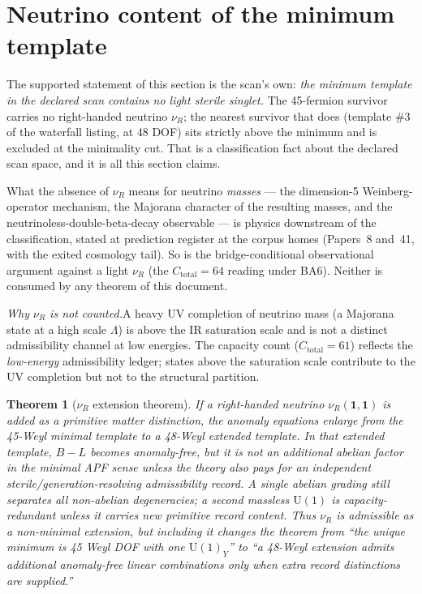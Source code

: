 \documentclass[11pt]{article}
\newtheorem{theorem}{Theorem}[section]
\theoremstyle{definition}
\newcommand{\U}{\mathrm{U}}
\begin{document}
\section{Neutrino content of the minimum template}
\label{sec:neutrinos}

The supported statement of this section is the scan's own: \emph{the
minimum template in the declared scan contains no light sterile
singlet.}  The 45-fermion survivor carries no right-handed neutrino
$\nu_R$; the nearest survivor that does (template \#3 of the
waterfall listing, at 48 DOF) sits strictly above the minimum and is
excluded at the minimality cut.  That is a classification fact about
the declared scan space, and it is all this section claims.

What the absence of $\nu_R$ means for neutrino \emph{masses} ---
the dimension-5 Weinberg-operator mechanism, the Majorana character
of the resulting masses, and the neutrinoless-double-beta-decay
observable --- is physics downstream of the classification, stated at
prediction register at the corpus homes (Papers~8 and~41, with the
exited cosmology tail).  So is the bridge-conditional observational
argument against a light $\nu_R$ (the $C_{\mathrm{total}} = 64$
reading under BA6).  Neither is consumed by any theorem of this
document.

\smallskip\noindent\textit{Why $\nu_R$ is not counted.}\quad A heavy
UV completion of neutrino mass (a Majorana state at a high scale
$\Lambda$) is above the IR saturation scale and is not a distinct
admissibility channel at low energies.  The capacity count
($C_{\mathrm{total}} = 61$) reflects the \emph{low-energy}
admissibility ledger; states above the saturation scale contribute to
the UV completion but not to the structural partition.


\begin{theorem}[$\nu_R$ extension theorem]
\label{thm:nuR_extension}
If a right-handed neutrino $\nu_R(\mathbf 1,\mathbf 1)$ is added as a
primitive matter distinction, the anomaly equations enlarge from the
45-Weyl minimal template to a 48-Weyl extended template.  In that extended
template, $B-L$ becomes anomaly-free, but it is not an additional abelian
factor in the minimal APF sense unless the theory also pays for an
independent sterile/generation-resolving admissibility record.  A single
abelian grading still separates all non-abelian degeneracies; a second
massless $\U(1)$ is capacity-redundant unless it carries new primitive
record content.  Thus $\nu_R$ is admissible as a non-minimal extension, but
including it changes the theorem from ``the unique minimum is 45 Weyl DOF
with one $\U(1)_Y$'' to ``a 48-Weyl extension admits additional anomaly-free
linear combinations only when extra record distinctions are supplied.''
\end{theorem}
\end{document}
